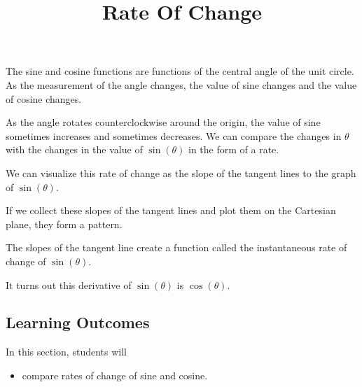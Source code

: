 \documentclass{ximera}
\title{Rate Of Change}
\begin{document}
\begin{abstract}
%
\end{abstract}
\maketitle




The sine and cosine functions are functions of the central angle of the unit circle.  As the measurement of the angle changes, the value of sine changes and the value of cosine changes.  


As the angle rotates counterclockwise around the origin, the value of sine sometimes increases and sometimes decreases.  We can compare the changes in $\theta$ with the changes in the value of $\sin(\theta)$ in the form of a rate. 

We can visualize this rate of change as the slope of the tangent lines to the graph of $\sin(\theta)$.

If we collect these slopes of the tangent lines and plot them on the Cartesian plane, they form a pattern.


The slopes of the tangent line create a function called the instantaneous rate of change of $\sin(\theta)$.

It turns out this derivative of $\sin(\theta)$ is $\cos(\theta)$.
















\subsection{Learning Outcomes}

\begin{sectionOutcomes}
In this section, students will 

\begin{itemize}
\item compare rates of change of sine and cosine.
\end{itemize}
\end{sectionOutcomes}
\end{document}
